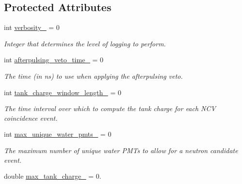 \subsection*{Protected Attributes}
\begin{DoxyCompactItemize}
\item 
\hypertarget{classPhaseITreeMaker_a75f89b2e33d97896b1d9364a20e542dd}{
int \hyperlink{classPhaseITreeMaker_a75f89b2e33d97896b1d9364a20e542dd}{verbosity\_\-} = 0}
\label{classPhaseITreeMaker_a75f89b2e33d97896b1d9364a20e542dd}

\begin{DoxyCompactList}\small\item\em Integer that determines the level of logging to perform. \item\end{DoxyCompactList}\item 
\hypertarget{classPhaseITreeMaker_ab43b43c6e78f17bc649edc8b86b0d245}{
int \hyperlink{classPhaseITreeMaker_ab43b43c6e78f17bc649edc8b86b0d245}{afterpulsing\_\-veto\_\-time\_\-} = 0}
\label{classPhaseITreeMaker_ab43b43c6e78f17bc649edc8b86b0d245}

\begin{DoxyCompactList}\small\item\em The time (in ns) to use when applying the afterpulsing veto. \item\end{DoxyCompactList}\item 
\hypertarget{classPhaseITreeMaker_a7cfb0cb750c6c6bb5c7d0ece1b837dbb}{
int \hyperlink{classPhaseITreeMaker_a7cfb0cb750c6c6bb5c7d0ece1b837dbb}{tank\_\-charge\_\-window\_\-length\_\-} = 0}
\label{classPhaseITreeMaker_a7cfb0cb750c6c6bb5c7d0ece1b837dbb}

\begin{DoxyCompactList}\small\item\em The time interval over which to compute the tank charge for each NCV coincidence event. \item\end{DoxyCompactList}\item 
\hypertarget{classPhaseITreeMaker_a4cf3023fb082c58b2ce75ee63cb60372}{
int \hyperlink{classPhaseITreeMaker_a4cf3023fb082c58b2ce75ee63cb60372}{max\_\-unique\_\-water\_\-pmts\_\-} = 0}
\label{classPhaseITreeMaker_a4cf3023fb082c58b2ce75ee63cb60372}

\begin{DoxyCompactList}\small\item\em The maximum number of unique water PMTs to allow for a neutron candidate event. \item\end{DoxyCompactList}\item 
\hypertarget{classPhaseITreeMaker_a987ef63235bef3d80f1b212ecd6bc5f5}{
double \hyperlink{classPhaseITreeMaker_a987ef63235bef3d80f1b212ecd6bc5f5}{max\_\-tank\_\-charge\_\-} = 0.}
\label{classPhaseITreeMaker_a987ef63235bef3d80f1b212ecd6bc5f5}


\end{DoxyCompactItemize}
